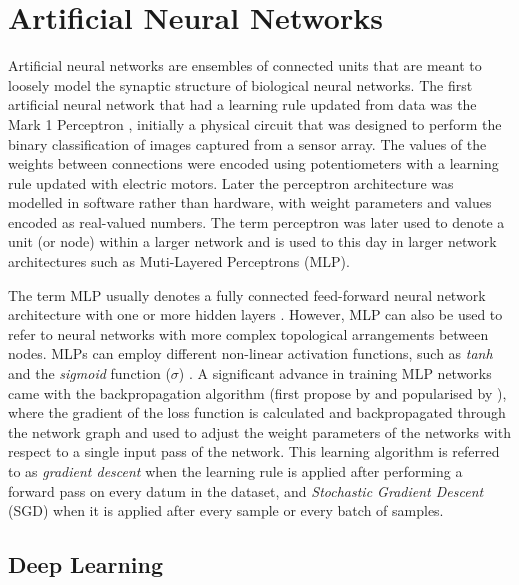 \section{Artificial Neural Networks}
\label{c2:subsec:neural-networks}

Artificial neural networks are ensembles of connected units that are meant to loosely model the synaptic structure of biological neural networks. 
The first artificial neural network that had a learning rule updated from data was the Mark 1 Perceptron \citep{rosenblatt1958perceptron}, initially a physical circuit that was designed to perform the binary classification of images captured from a sensor array. 
The values of the weights between connections were encoded using potentiometers with a learning rule updated with electric motors. 
Later the perceptron architecture was modelled in software rather than hardware, with weight parameters and values encoded as real-valued numbers. 
The term perceptron was later used to denote a unit (or node) within a larger network and is used to this day in larger network architectures such as Muti-Layered Perceptrons (MLP).

The term MLP usually denotes a fully connected feed-forward neural network architecture with one or more hidden layers \citep{rosenblatt1958perceptron}. 
However, MLP can also be used to refer to neural networks with more complex topological arrangements between nodes. 
MLPs can employ different non-linear activation functions, such as \textit{tanh} \citep{kalman1992tanh} and the \textit{sigmoid} function ($\sigma$) \citep{han1995influence}.
A significant advance in training MLP networks came with the backpropagation algorithm (first propose by \cite{werbos1974beyond} and popularised by \cite{rumelhart1986learning}), where the gradient of the loss function is calculated and backpropagated through the network graph and used to adjust the weight parameters of the networks with respect to a single input pass of the network. 
This learning algorithm is referred to as \textit{gradient descent} when the learning rule is applied after performing a forward pass on every datum in the dataset, and \textit{Stochastic Gradient Descent} (SGD) when it is applied after every sample or every batch of samples. 

\subsection{Deep Learning}

